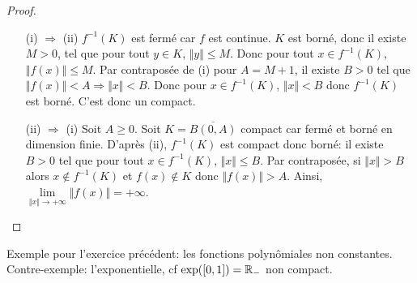 \begin{proof}
	\phantom{}
	\begin{enumerate}
		\item [(i) $\Rightarrow$ (ii)] $f^{-1}(K)$ est fermé car $f$ est continue. $K$ est borné, donc il existe $M>0$, tel que pour tout $y\in K$, $\Vert y\Vert\leqslant M$. Donc pour tout $x\in f^{-1}(K)$, $\Vert f(x)\Vert\leqslant M$. Par contraposée de (i) pour $A=M+1$, il existe $B>0$ tel que $\Vert f(x)\Vert<A\Rightarrow\Vert x\Vert<B$. Donc pour $x\in f^{-1}(K)$, $\Vert x\Vert<B$ donc $f^{-1}(K)$ est borné. C'est donc un compact.
		\item [(ii) $\Rightarrow$ (i)] Soit $A\geqslant0$. Soit $K=\overline{B(0,A)}$ compact car fermé et borné en dimension finie. D'après (ii), $f^{-1}(K)$ est compact donc borné: il existe $B>0$ tel que pour tout $x\in f^{-1}(K)$, $\Vert x\Vert\leqslant B$. Par contraposée, si $\Vert x\Vert>B$ alors $x\notin f^{-1}(K)$ et $f(x)\notin K$ donc $\Vert f(x)\Vert >A$. Ainsi, $\lim\limits_{\Vert x\Vert\to+\infty}\Vert f(x)\Vert=+\infty$.
	\end{enumerate}
\end{proof}

\begin{remark}
	Exemple pour l'exercice précédent: les fonctions polynômiales non constantes. Contre-exemple: l'exponentielle, cf $\exp([0,1])=\mathbb{R}_{-}$ non compact.
\end{remark}


